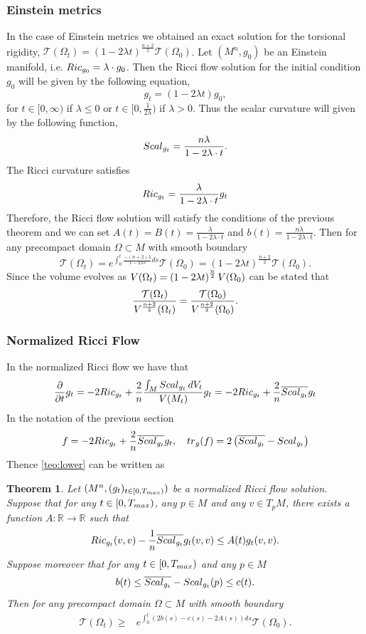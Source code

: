 \documentclass{amsart}
\newtheorem{theorem}{Theorem}[section]
\theoremstyle{definition}
\theoremstyle{remark}
\newcommand{\Ric}{{\rm Ric}}
\newcommand{\tr}{{\rm tr}}
\newcommand{\V}{{\rm V}}
\begin{document}
\subsubsection{Einstein metrics}\label{sec:Einstein}
In the case of Einstein metrics we obtained an exact solution for the torsional rigidity, 
        $
    \mathcal{T}(\Omega_t)= \left(1-2\lambda t\right)^{\frac{n+2}{2}} \mathcal{T}(\Omega_0)
    $.
Let $(M^n,g_0)$ be an Einstein manifold, i.e. $\Ric_{g_0}=\lambda\cdot g_0$. Then the Ricci flow solution for the initial condition $g_0$ will be given by the following equation, 
    $$
    g_t= (1-2\lambda t)g_0,
    $$
    for $t\in [0,\infty)$ if $\lambda\leq 0$ or $t\in [0,\frac{1}{2\lambda})$ if $\lambda > 0$.
    Thus the scalar curvature will given by the following function, 
    $$
    {\rm Scal}_{g_t}= \frac{n\lambda}{1-2\lambda \cdot t}.
    $$
    The Ricci curvature satisfies
    $$
\Ric_{g_t}=\frac{\lambda}{1-2\lambda \cdot t}g_t
    $$
    Therefore, the Ricci flow solution will satisfy the conditions of the previous theorem and we can set $A(t)=B(t)=\frac{\lambda}{1-2\lambda \cdot t}$ and $b(t)=\frac{n\lambda}{1-2\lambda \cdot t}$. Then for any precompact domain $\Omega\subset M$ with smooth boundary
    $$
\mathcal{T}(\Omega_t)=e^{\int_0^t\frac{-(n+2)\lambda}{1-2\lambda s}ds}\mathcal{T}(\Omega_0)=\left(1-2\lambda t\right)^{\frac{n+2}{2}}\mathcal{T}(\Omega_0).
    $$
    Since the volume evolves as $\V(\Omega_t)=\left(1-2\lambda t\right)^{\frac{n}{2}}\V(\Omega_0)$ can be stated that
$$
\frac{\mathcal{T}(\Omega_t)}{\V^\frac{n+2}{2}(\Omega_t)}=\frac{\mathcal{T}(\Omega_0)}{\V^\frac{n+2}{2}(\Omega_0)}.
$$
    
\subsubsection{Normalized Ricci Flow}
In the normalized Ricci flow we have that
$$
\frac{\partial}{\partial t}g_t=-2\Ric_{g_t}+\frac{2}{n}\frac{\int_M {\rm Scal}_{g_t}\, d\V_t}{{\rm V}(M_t)}g_t=-2\Ric_{g_t}+\frac{2}{n} \overline{{\rm Scal}_{g_t}}g_t
$$
In the notation of the previous section 
$$
f=-2\Ric_{g_t}+\frac{2}{n} \overline{{\rm Scal}_{g_t}}g_t,\quad \tr_g(f)=2\left(\overline{{\rm Scal}_{g_t}}-{\rm Scal}_{g_t}\right)
$$
Thence \ref{teo:lower} can be written as
 \begin{theorem}
Let $(M^n,(g_t)_{t\in [0,T_{\rm max})})$ be a normalized Ricci flow solution. Suppose that for any $t\in [0,T_{\rm max})$, any $p\in M$ and any $v\in T_pM$, there exists a function $A:\mathbb{R}\to\mathbb{R}$ such that 
$$
{\rm Ric}_{g_t}(v,v)-\frac{1}{n}\overline{{\rm Scal}_{g_t}}g_t(v,v)\leq A(t)g_t(v,v). 
$$
Suppose moreover that for any $t\in [0,T_{\rm max})$ and any $p\in M$
$$
b(t)\leq \overline{{\rm Scal}_{g_t}}-{\rm Scal}_{g_t}(p)\leq c(t).
$$
Then for any precompact domain $\Omega\subset M$ with smooth boundary 
$$
\begin{aligned}
\mathcal{T}(\Omega_t)\geq& e^{\int_0^t\left(2b(s)-c(s)-2A(s)\right)ds}\mathcal{T}(\Omega_0). 
\end{aligned}
$$
 \end{theorem}
\end{document}
